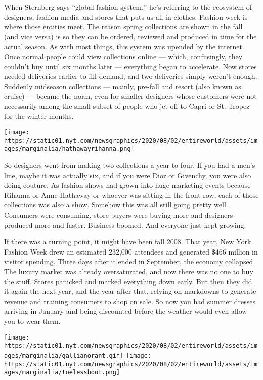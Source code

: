 When Sternberg says ``global fashion system,'' he's referring to the
ecosystem of designers, fashion media and stores that puts us all in
clothes. Fashion week is where those entities meet. The reason spring
collections are shown in the fall (and vice versa) is so they can be
ordered, reviewed and produced in time for the actual season. As with
most things, this system was upended by the internet. Once normal people
could view collections online --- which, confusingly, they couldn't buy
until six months later --- everything began to accelerate. Now stores
needed deliveries earlier to fill demand, and two deliveries simply
weren't enough. Suddenly midseason collections --- mainly, pre-fall and
resort (also known as cruise) --- became the norm, even for smaller
designers whose customers were not necessarily among the small subset of
people who jet off to Capri or St.-Tropez for the winter months.

\texttt{[image: https://static01.nyt.com/newsgraphics/2020/08/02/entireworld/assets/images/marginalia/hathawayrihanna.png]}

So designers went from making two collections a year to four. If you had
a men's line, maybe it was actually six, and if you were Dior or
Givenchy, you were also doing couture. As fashion shows had grown into
huge marketing events because Rihanna or Anne Hathaway or whoever was
sitting in the front row, each of those collections was also a show.
Somehow this was all still going pretty well. Consumers were consuming,
store buyers were buying more and designers produced more and faster.
Business boomed. And everyone just kept growing.

If there was a turning point, it might have been fall 2008. That year,
New York Fashion Week drew an estimated 232,000 attendees and generated
\$466 million in visitor spending. Three days after it ended in
September, the economy collapsed. The luxury market was already
oversaturated, and now there was no one to buy the stuff. Stores
panicked and marked everything down early. But then they did it again
the next year, and the year after that, relying on markdowns to generate
revenue and training consumers to shop on sale. So now you had summer
dresses arriving in January and being discounted before the weather
would even allow you to wear them.

\texttt{[image: https://static01.nyt.com/newsgraphics/2020/08/02/entireworld/assets/images/marginalia/gallianorant.gif]}
\texttt{[image: https://static01.nyt.com/newsgraphics/2020/08/02/entireworld/assets/images/marginalia/toelessboot.png]}


